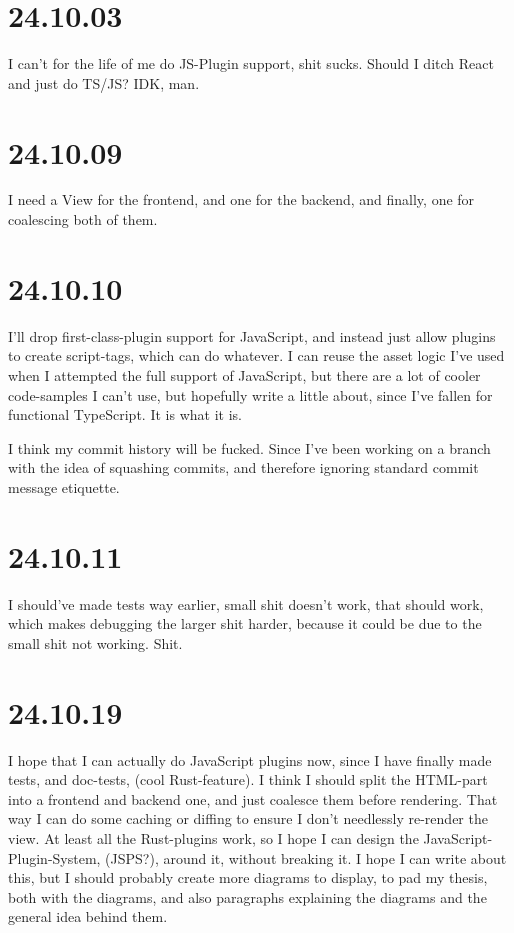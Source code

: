 \section{24.10.03}

I can't for the life of me do JS-Plugin support, shit sucks.
Should I ditch React and just do TS/JS? IDK, man.


\section{24.10.09}

I need a View for the frontend, and one for the backend, and finally, one for
coalescing both of them.


\section{24.10.10}

I'll drop first-class-plugin support for JavaScript, and instead just allow
plugins to create script-tags, which can do whatever. I can reuse the asset
logic I've used when I attempted the full support of JavaScript, but there are
a lot of cooler code-samples I can't use, but hopefully write a little about,
since I've fallen for functional TypeScript. It is what it is.

I think my commit history will be fucked. Since I've been working on a branch
with the idea of squashing commits, and therefore ignoring standard commit
message etiquette.


\section{24.10.11}

I should've made tests way earlier, small shit doesn't work, that should work,
which makes debugging the larger shit harder, because it could be due to the
small shit not working. Shit.


\section{24.10.19}

I hope that I can actually do JavaScript plugins now, since I have finally made
tests, and doc-tests, (cool Rust-feature). I think I should split the HTML-part
into a frontend and backend one, and just coalesce them before rendering. That
way I can do some caching or diffing to ensure I don't needlessly re-render the
view.
At least all the Rust-plugins work, so I hope I can design the
JavaScript-Plugin-System, (JSPS?), around it, without breaking it. I hope I can
write about this, but I should probably create more diagrams to display, to pad
my thesis, both with the diagrams, and also paragraphs explaining the diagrams
and the general idea behind them.

